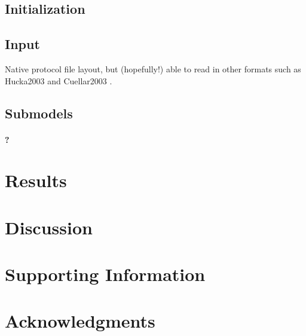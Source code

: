 \documentclass[10pt,letterpaper]{article}
\begin{document}
\subsection*{Initialization}

\subsection*{Input}
Native protocol file layout, but (hopefully!) able to read in other formats such as Hucka2003 \cite{Hucka2003} and Cuellar2003 \cite{Cuellar2003}.


\subsection*{Submodels}
\paragraph{?}


\section*{Results}



\section*{Discussion}


\section*{Supporting Information}



\section*{Acknowledgments}

\nolinenumbers

%
%
\end{document}
